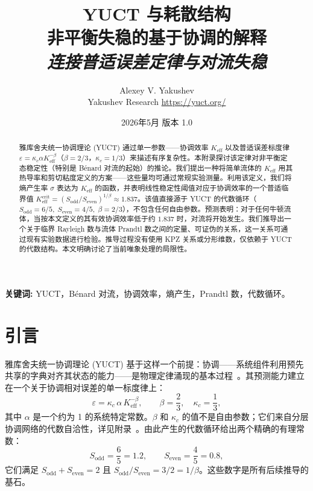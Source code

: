 \documentclass[12pt,a4paper]{article}
\begin{document}
	
	\title{\huge\textbf{YUCT 与耗散结构}\\[0.2cm]
		\Large 非平衡失稳的基于协调的解释\\[0.3cm]
		\large \textit{连接普适误差定律与对流失稳}}
	\author{Alexey V. Yakushev\\[0.2cm] \small Yakushev Research \quad \url{https://yuct.org/}}
	\date{\small 2026年5月 \quad 版本 1.0}
	\maketitle
	
	\begin{abstract}
		\noindent 
		雅库舍夫统一协调理论 (YUCT) 通过单一参数——协调效率 \(K_{\mathrm{eff}}\) 以及普适误差标度律 \(\varepsilon = \kappa_c\alpha K_{\mathrm{eff}}^{-\beta}\)（\(\beta = 2/3\)，\(\kappa_c = 1/3\)）来描述有序复杂性。本附录探讨该定律对非平衡定态稳定性（特别是 B\'{e}nard 对流的起始）的推论。我们提出一种将简单流体的 \(K_{\mathrm{eff}}\) 用其热导率和剪切粘度定义的方案——这些量均可通过常规实验测量。利用该定义，我们将熵产生率 \(\sigma\) 表达为 \(K_{\mathrm{eff}}\) 的函数，并表明线性稳定性阈值对应于协调效率的一个普适临界值 \(K_{\mathrm{eff}}^{\mathrm{crit}} = (S_{\mathrm{odd}}/S_{\mathrm{even}})^{1/\beta} \approx 1.837\)。该值直接源于 YUCT 的代数循环（\(S_{\mathrm{odd}} = 6/5,\; S_{\mathrm{even}} = 4/5,\; \beta = 2/3\)），不包含任何自由参数。预测表明：对于任何牛顿流体，当按本文定义的其有效协调效率低于约 \(1.837\) 时，对流将开始发生。我们推导出一个关于临界 Rayleigh 数与流体 Prandtl 数之间的定量、可证伪的关系，这一关系可通过现有实验数据进行检验。推导过程没有使用 KPZ 关系或分形维数，仅依赖于 YUCT 的代数结构。本文明确讨论了当前唯象处理的局限性。
	\end{abstract}
	\vspace{0.5cm}
	\noindent\textbf{关键词:} YUCT，B\'{e}nard 对流，协调效率，熵产生，Prandtl 数，代数循环。
	
	\newpage
	\tableofcontents
	\newpage
	
	\section{引言}
	
	雅库舍夫统一协调理论 (YUCT) 基于这样一个前提：协调——系统组件利用预先共享的字典对齐其状态的能力——是物理定律涌现的基本过程~\cite{Yakushev2026}。其预测能力建立在一个关于协调相对误差的单一标度律上：
	\begin{equation}\label{eq:universal}
		\varepsilon = \kappa_c\,\alpha\, K_{\mathrm{eff}}^{-\beta},\qquad 
		\beta = \frac{2}{3},\quad \kappa_c = \frac{1}{3},
	\end{equation}
	其中 \(\alpha\) 是一个约为 1 的系统特定常数。\(\beta\) 和 \(\kappa_c\) 的值不是自由参数；它们来自分层协调网络的代数自洽性，详见附录~\cite{AppendixY, AppendixL, AppendixFerra, AppendixAF}。由此产生的代数循环给出两个精确的有理常数：
	\begin{equation}\label{eq:S-constants}
		S_{\mathrm{odd}} = \frac{6}{5} = 1.2,\qquad
		S_{\mathrm{even}} = \frac{4}{5} = 0.8,
	\end{equation}
	它们满足 \(S_{\mathrm{odd}} + S_{\mathrm{even}} = 2\) 且 \(S_{\mathrm{odd}}/S_{\mathrm{even}} = 3/2 = 1/\beta\)。这些数字是所有后续推导的基石。
	
\end{document}
